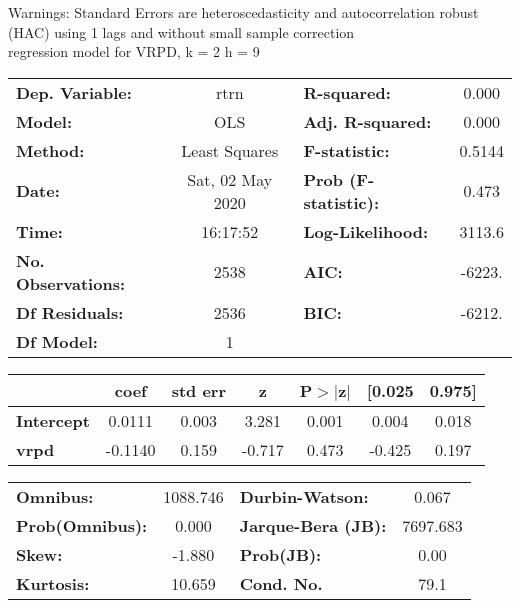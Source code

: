 Warnings: \newline
 [1] Standard Errors are heteroscedasticity and autocorrelation robust (HAC) using 1 lags and without small sample correction\\ 

regression model for VRPD, k = 2 h = 9\begin{center}
\begin{tabular}{lclc}
\toprule
\textbf{Dep. Variable:}    &       rtrn       & \textbf{  R-squared:         } &     0.000   \\
\textbf{Model:}            &       OLS        & \textbf{  Adj. R-squared:    } &     0.000   \\
\textbf{Method:}           &  Least Squares   & \textbf{  F-statistic:       } &    0.5144   \\
\textbf{Date:}             & Sat, 02 May 2020 & \textbf{  Prob (F-statistic):} &    0.473    \\
\textbf{Time:}             &     16:17:52     & \textbf{  Log-Likelihood:    } &    3113.6   \\
\textbf{No. Observations:} &        2538      & \textbf{  AIC:               } &    -6223.   \\
\textbf{Df Residuals:}     &        2536      & \textbf{  BIC:               } &    -6212.   \\
\textbf{Df Model:}         &           1      & \textbf{                     } &             \\
\bottomrule
\end{tabular}
\begin{tabular}{lcccccc}
                   & \textbf{coef} & \textbf{std err} & \textbf{z} & \textbf{P$> |$z$|$} & \textbf{[0.025} & \textbf{0.975]}  \\
\midrule
\textbf{Intercept} &       0.0111  &        0.003     &     3.281  &         0.001        &        0.004    &        0.018     \\
\textbf{vrpd}      &      -0.1140  &        0.159     &    -0.717  &         0.473        &       -0.425    &        0.197     \\
\bottomrule
\end{tabular}
\begin{tabular}{lclc}
\textbf{Omnibus:}       & 1088.746 & \textbf{  Durbin-Watson:     } &    0.067  \\
\textbf{Prob(Omnibus):} &   0.000  & \textbf{  Jarque-Bera (JB):  } & 7697.683  \\
\textbf{Skew:}          &  -1.880  & \textbf{  Prob(JB):          } &     0.00  \\
\textbf{Kurtosis:}      &  10.659  & \textbf{  Cond. No.          } &     79.1  \\
\bottomrule
\end{tabular}
\end{center}


